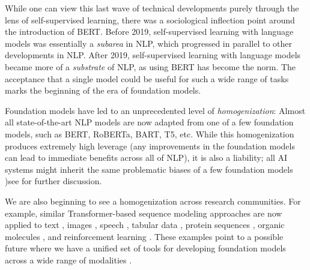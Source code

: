 While one can view this last wave of technical developments purely through the lens of self-supervised learning,
there was a sociological inflection point around the introduction of BERT.
Before 2019, self-supervised learning with language models was essentially a \emph{subarea} in NLP,
which progressed in parallel to other developments in NLP.
After 2019, self-supervised learning with language models became more of a \emph{substrate} of NLP,
as using BERT has become the norm.
The acceptance that a single model could be useful for such a wide range of tasks
marks the beginning of the era of foundation models.

Foundation models have led to an unprecedented level of \emph{homogenization}:
Almost all state-of-the-art NLP models
are now adapted from one of a few foundation models,
such as BERT, RoBERTa, BART, T5, etc.
While this homogenization produces extremely high leverage
(any improvements in the foundation models can lead to immediate benefits
across all of NLP), it is also a liability; all AI systems might
inherit the same problematic biases of a few foundation models \citep[][\textit{inter alia}]{bolukbasi2016, caliskan2017, abid2021})\dash{}see  for further discussion.

We are also beginning to see a homogenization across research communities.
For example, similar Transformer-based sequence modeling approaches
are now applied to text \citep{devlin2019bert, radford2019language, raffel2019exploring},
images \citep{visual_transformer, chen2020imagegpt}, speech \citep{Liu2020MockingjayUS}, tabular data
\citep{Yin2020TaBERTPF},
protein sequences \citep{rives2021},
organic molecules \citep{rothchild2021c5t5},
and reinforcement learning \citep{Chen2021DecisionTR, Janner2021ReinforcementLA}.
These examples point to a possible future where we have
a unified set of tools for developing foundation models across a wide range of modalities \citep{Tamkin2021DABS}.

